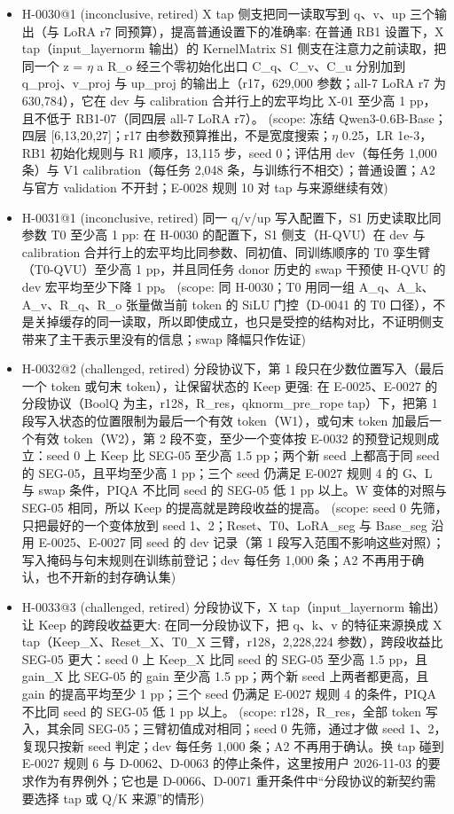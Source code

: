 \documentclass[11pt]{article}
\begin{document}
\begin{itemize}
\item H-0030@1 (inconclusive, retired) X tap 侧支把同一读取写到 q、v、up 三个输出（与 LoRA r7 同预算），提高普通设置下的准确率: 在普通 RB1 设置下，X tap（input\_layernorm 输出）的 KernelMatrix S1 侧支在注意力之前读取，把同一个 z = \ensuremath{\eta} a R\_o 经三个零初始化出口 C\_q、C\_v、C\_u 分别加到 q\_proj、v\_proj 与 up\_proj 的输出上（r17，629,000 参数；all-7 LoRA r7 为 630,784），它在 dev 与 calibration 合并行上的宏平均比 X-01 至少高 1 pp，且不低于 RB1-07（同四层 all-7 LoRA r7）。 (scope: 冻结 Qwen3-0.6B-Base；四层 [6,13,20,27]；r17 由参数预算推出，不是宽度搜索；\ensuremath{\eta} 0.25，LR 1e-3，RB1 初始化规则与 R1 顺序，13,115 步，seed 0；评估用 dev（每任务 1,000 条）与 V1 calibration（每任务 2,048 条，与训练行不相交）；普通设置；A2 与官方 validation 不开封；E-0028 规则 10 对 tap 与来源继续有效)
\item H-0031@1 (inconclusive, retired) 同一 q/v/up 写入配置下，S1 历史读取比同参数 T0 至少高 1 pp: 在 H-0030 的配置下，S1 侧支（H-QVU）在 dev 与 calibration 合并行上的宏平均比同参数、同初值、同训练顺序的 T0 孪生臂（T0-QVU）至少高 1 pp，并且同任务 donor 历史的 swap 干预使 H-QVU 的 dev 宏平均至少下降 1 pp。 (scope: 同 H-0030；T0 用同一组 A\_q、A\_k、A\_v、R\_q、R\_o 张量做当前 token 的 SiLU 门控（D-0041 的 T0 口径），不是关掉缓存的同一读取，所以即使成立，也只是受控的结构对比，不证明侧支带来了主干表示里没有的信息；swap 降幅只作佐证)
\item H-0032@2 (challenged, retired) 分段协议下，第 1 段只在少数位置写入（最后一个 token 或句末 token），让保留状态的 Keep 更强: 在 E-0025、E-0027 的分段协议（BoolQ 为主，r128，R\_res，qknorm\_pre\_rope tap）下，把第 1 段写入状态的位置限制为最后一个有效 token（W1），或句末 token 加最后一个有效 token（W2），第 2 段不变，至少一个变体按 E-0032 的预登记规则成立：seed 0 上 Keep 比 SEG-05 至少高 1.5 pp；两个新 seed 上都高于同 seed 的 SEG-05，且平均至少高 1 pp；三个 seed 仍满足 E-0027 规则 4 的 G、L 与 swap 条件，PIQA 不比同 seed 的 SEG-05 低 1 pp 以上。W 变体的对照与 SEG-05 相同，所以 Keep 的提高就是跨段收益的提高。 (scope: seed 0 先筛，只把最好的一个变体放到 seed 1、2；Reset、T0、LoRA\_seg 与 Base\_seg 沿用 E-0025、E-0027 同 seed 的 dev 记录（第 1 段写入范围不影响这些对照）；写入掩码与句末规则在训练前登记；dev 每任务 1,000 条；A2 不再用于确认，也不开新的封存确认集)
\item H-0033@3 (challenged, retired) 分段协议下，X tap（input\_layernorm 输出）让 Keep 的跨段收益更大: 在同一分段协议下，把 q、k、v 的特征来源换成 X tap（Keep\_X、Reset\_X、T0\_X 三臂，r128，2,228,224 参数），跨段收益比 SEG-05 更大：seed 0 上 Keep\_X 比同 seed 的 SEG-05 至少高 1.5 pp，且 gain\_X 比 SEG-05 的 gain 至少高 1.5 pp；两个新 seed 上两者都更高，且 gain 的提高平均至少 1 pp；三个 seed 仍满足 E-0027 规则 4 的条件，PIQA 不比同 seed 的 SEG-05 低 1 pp 以上。 (scope: r128，R\_res，全部 token 写入，其余同 SEG-05；三臂初值成对相同；seed 0 先筛，通过才做 seed 1、2，复现只按新 seed 判定；dev 每任务 1,000 条；A2 不再用于确认。换 tap 碰到 E-0027 规则 6 与 D-0062、D-0063 的停止条件，这里按用户 2026-11-03 的要求作为有界例外；它也是 D-0066、D-0071 重开条件中``分段协议的新契约需要选择 tap 或 Q/K 来源''的情形)
\end{itemize}
\end{document}
